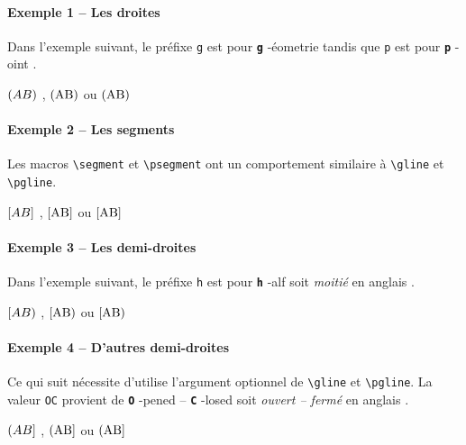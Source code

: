 \documentclass[12pt,a4paper]{article}
\newcommand\env[1]{\texttt{#1}}
\newcommand\macro[1]{\env{\textbackslash{}#1}}
\theoremstyle{definition}
\newcommand\whyprefix[2]{%
	\textbf{\prefix{#1}}-#2%
}
\newcommand\prefix[1]{%
	\texttt{#1}%
}
\newcommand\inenglish[1]{%
	\emph{\og #1 \fg} en anglais%
}
\begin{document}
\paragraph{Exemple 1 -- Les droites}

Dans l'exemple suivant, le préfixe \prefix{g} est pour \whyprefix{g}{éometrie} tandis que \prefix{p} est pour \whyprefix{p}{oint}.

\begin{latexex}
$\gline{A}{B}$ ,
$\gline{\pt{A}}{\pt{B}}$ ou
$\pgline{A}{B}$
\end{latexex}




\paragraph{Exemple 2 -- Les segments}

Les macros \macro{segment} et \macro{psegment} ont un comportement similaire à \macro{gline} et \macro{pgline}.

\begin{latexex}
$\segment{A}{B}$ ,
$\segment{\pt{A}}{\pt{B}}$ ou
$\psegment{A}{B}$
\end{latexex}




\paragraph{Exemple 3 -- Les demi-droites}

Dans l'exemple suivant, le préfixe \prefix{h} est pour \whyprefix{h}{alf}  soit \inenglish{moitié}.

\begin{latexex}
$\hgline{A}{B}$ ,
$\hgline{\pt{A}}{\pt{B}}$ ou
$\phgline{A}{B}$
\end{latexex}




\paragraph{Exemple 4 -- D'autres demi-droites}

Ce qui suit nécessite d'utilise l'argument optionnel de \macro{gline} et \macro{pgline}. La valeur \prefix{OC} provient de \whyprefix{O}{pened} -- \whyprefix{C}{losed} soit \inenglish{ouvert -- fermé}.

\begin{latexex}
$\gline[OC]{A}{B}$ ,
$\gline[OC]{\pt{A}}{\pt{B}}$ ou
$\pgline[OC]{A}{B}$
\end{latexex}
\end{document}
